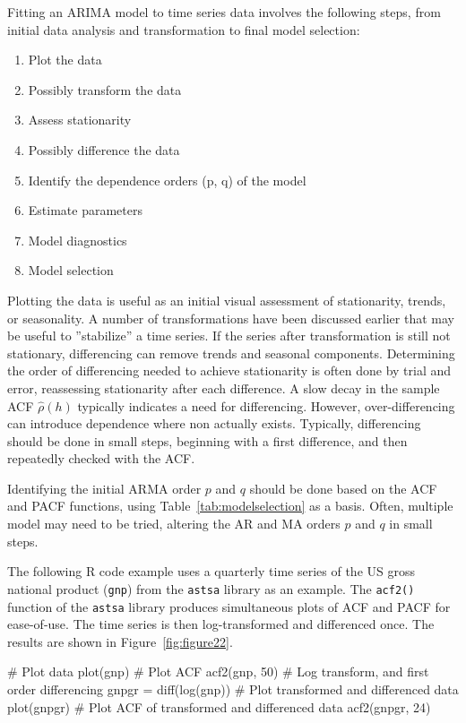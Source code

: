 Fitting an ARIMA model to time series data involves the following steps, from initial data analysis and transformation to final model selection:

\begin{enumerate}
  \item Plot the data
  \item Possibly transform the data
  \item Assess stationarity
  \item Possibly difference the data
  \item Identify the dependence orders (p, q) of the model
  \item Estimate parameters
  \item Model diagnostics
  \item Model selection
\end{enumerate}

Plotting the data is useful as an initial visual assessment of stationarity, trends, or seasonality. A number of transformations have been discussed earlier that may be useful to ''stabilize'' a time series. If the series after transformation is still not stationary, differencing can remove trends and seasonal components. Determining the order of differencing needed to achieve stationarity is often done by trial and error, reassessing stationarity after each difference. A slow decay in the sample ACF $\hat\rho(h)$ typically indicates a need for differencing. However, over-differencing can introduce dependence where non actually exists. Typically, differencing should be done in small steps, beginning with a first difference, and then repeatedly checked with the ACF.

Identifying the initial ARMA order $p$ and $q$ should be done based on the ACF and PACF functions, using Table~\ref{tab:modelselection} as a basis. Often, multiple model may need to be tried, altering the AR and MA orders $p$ and $q$ in small steps. 

The following R code example uses a quarterly time series of the US gross national product (\texttt{gnp}) from the \texttt{astsa} library as an example. The \texttt{acf2()} function of the \texttt{astsa} library produces simultaneous plots of ACF and PACF for ease-of-use. The time series is then log-transformed and differenced once. The results are shown in Figure~\ref{fig:figure22}.

\begin{samepage}
\begin{Rcode}
# Plot data
plot(gnp)
# Plot ACF
acf2(gnp, 50)
# Log transform, and first order differencing
gnpgr = diff(log(gnp))
# Plot transformed and differenced data
plot(gnpgr)
# Plot ACF of transformed and differenced data
acf2(gnpgr, 24)
\end{Rcode}
\end{samepage}

